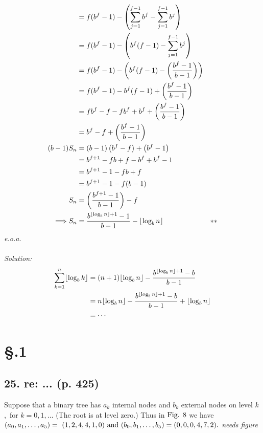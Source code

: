 \documentclass[fontsize=11pt, paper=a4]{scrartcl}
\DeclarePairedDelimiter\floor{\lfloor}{\rfloor}
\begin{document}
\begin{enumerate}[(a), leftmargin=1.5cm]
\begin{align*}
            &=  f(b^{f} - 1) - \left(\sum_{j=1}^{f-1} {b^{f}} - \sum_{j=1}^{f-1} b^{j}\right)\\
            &=  f(b^{f} - 1) - \left(b^{f}(f-1) - \sum_{j=1}^{f-1} b^{j}\right)\\
            &=  f(b^{f} - 1) - \left(b^{f}(f-1) - \left(\frac {b^{f}-1}{b-1}\right)\right)\\
            &=  f(b^{f} - 1) - b^{f}(f-1) + \left(\frac {b^{f}-1}{b-1}\right)\\
            &=  fb^{f} - f - fb^{f} + b^{f} + \left(\frac {b^{f}-1}{b-1}\right)\\
            &=  b^{f} - f + \left(\frac {b^{f}-1}{b-1}\right)\\
            (b-1)S_{n}
            &=  (b-1)\left(b^{f} - f\right) + \left(b^{f}-1\right)\\
            &=  b^{f+1} - fb + f - b^{f} + b^{f} - 1\\
            &=  b^{f+1} - 1 - fb + f\\
            &=  b^{f+1} - 1 - f(b-1)\\
            S_{n}
            &= \left(\frac{b^{f+1} - 1}{b-1}\right) - f\\
            \Longrightarrow S_{n}
            &= \frac{b^{\floor*{\log_b{n}}+1} - 1}{b-1} - \floor*{\log_b{n}} & **\\
        \end{align*}
        \textit{e.o.a.}\\
        \vspace{0.5cm}
        \\\textit{Solution:}
        \begin{align*}
            \sum_{k=1}^{n} \floor*{\log_b{k}} 
            &= (n+1) \floor*{\log_b{n}} - \frac{b^{\floor*{\log_b{n}} + 1} - b} {b-1}\\
            &= n \floor*{\log_b{n}} - \frac{b^{\floor*{\log_b{n}} + 1} - b} {b-1} + \floor*{\log_b{n}}\\
            &= \cdots
        \end{align*}
\end{enumerate}

\section*{\S {}.1}\label{part: 6.2.1}
\subsection*{25. re: ... (p. 425)}\label{num: 25}

\parbox{\linewidth}{
    Suppose that a binary tree has $a_{k}$ internal nodes and $b_{k}$ external nodes on level $k$,\ 
    for $k=0,1,\dotsc$ (The root is at level zero.) Thus in $\text{Fig.\space} 8$ we have $(a_{0},a_{1},\dotsc,a_{5}) =\
    (1,2,4,4,1,0) \text{\space and\space} (b_{0}, b_{1}, \dotsc, b_{5}) = (0,0,0,4,7,2).$ \textit{needs figure}}
\end{document}
